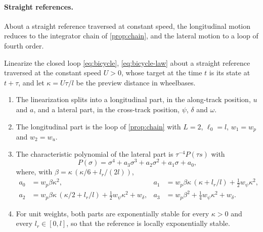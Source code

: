 \paragraph{Straight references.}
About a straight reference traversed at constant speed, the longitudinal motion reduces to the
integrator chain of \cref{prop:chain}, and the lateral motion to a loop of fourth order.

\begin{proposition}\label{prop:bicycle}
Linearize the closed loop \eqref{eq:bicycle}, \eqref{eq:bicycle-law} about a straight reference
traversed at the constant speed $U > 0$, whose target at the time $t$ is its state at $t + \tau$, and
let $\kappa = U\tau/l$ be the preview distance in wheelbases.
\begin{enumerate}
    \item The linearization splits into a longitudinal part, in the along-track position, $u$ and $a$,
    and a lateral part, in the cross-track position, $\psi$, $\delta$ and $\omega$.
    \item The longitudinal part is the loop of \cref{prop:chain} with $L = 2$, $\ell_0 = l$,
    $w_1 = w_p$ and $w_2 = w_u$.
    \item The characteristic polynomial of the lateral part is $\tau^{-4}P(\tau s)$ with
    \begin{equation}\label{eq:bicycle-lateral}
        P(\sigma) = \sigma^4 + a_3\sigma^3 + a_2\sigma^2 + a_1\sigma + a_0,
    \end{equation}
    where, with $\beta = \kappa\,(\kappa/6 + l_r/(2l))$,
    \[
    \begin{aligned}
        a_0 &= w_p\beta\kappa^2, &
        a_1 &= w_p\beta\kappa\,(\kappa + l_r/l) + \tfrac12 w_\psi\kappa^2, \\
        a_2 &= w_p\beta\kappa\,(\kappa/2 + l_r/l) + \tfrac12 w_\psi\kappa^2 + w_\delta, &
        a_3 &= w_p\beta^2 + \tfrac14 w_\psi\kappa^2 + w_\delta .
    \end{aligned}
    \]
    \item For unit weights, both parts are exponentially stable for every $\kappa > 0$ and every
    $l_r\in[0,l]$, so that the reference is locally exponentially stable.
\end{enumerate}
\end{proposition}

